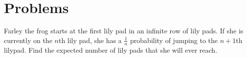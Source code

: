 \documentclass{article}
\begin{document}
\section{Problems}
\noindent{}

\begin{prob}[SMT 2021]{2}
Farley the frog starts at the first lily pad in an infinite row of lily pads. If she is currently on the $n$th lily pad, she has a $\frac{1}{n}$ probability of jumping to the $n+1$th lilypad. Find the expected number of lily pads that she will ever reach.
\end{prob}
\end{document}
